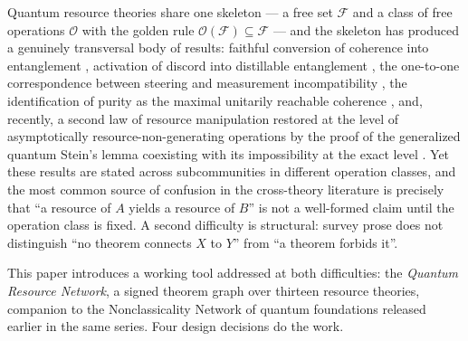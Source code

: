 \documentclass[11pt,a4paper]{article}
\theoremstyle{definition}
\newcommand{\F}{\mathcal{F}}
\newcommand{\Ops}{\mathcal{O}}
\begin{document}
Quantum resource theories share one skeleton --- a free set $\F$ and a class
of free operations $\Ops$ with the golden rule $\Ops(\F)\subseteq\F$
\cite{chitambargour2019} --- and the skeleton has produced a genuinely
transversal body of results: faithful conversion of coherence into
entanglement \cite{streltsov2015}, activation of discord into distillable
entanglement \cite{piani2011}, the one-to-one correspondence between steering
and measurement incompatibility \cite{uola2015}, the identification of purity
as the maximal unitarily reachable coherence \cite{streltsov2018njp}, and,
recently, a second law of resource manipulation restored at the level of
asymptotically resource-non-generating operations by the proof of the
generalized quantum Stein's lemma \cite{hayashiyamasaki2024,lami2024}
coexisting with its impossibility at the exact level
\cite{lamiregula2023}. Yet these results are stated across subcommunities in
different operation classes, and the most common source of confusion in the
cross-theory literature is precisely that ``a resource of $A$ yields a
resource of $B$'' is not a well-formed claim until the operation class is
fixed. A second difficulty is structural: survey prose does not distinguish
``no theorem connects $X$ to $Y$'' from ``a theorem forbids it''.

This paper introduces a working tool addressed at both difficulties: the
\emph{Quantum Resource Network}, a signed theorem graph over thirteen
resource theories, companion to the Nonclassicality Network of quantum
foundations released earlier in the same series. Four design decisions do
the work.
\end{document}
